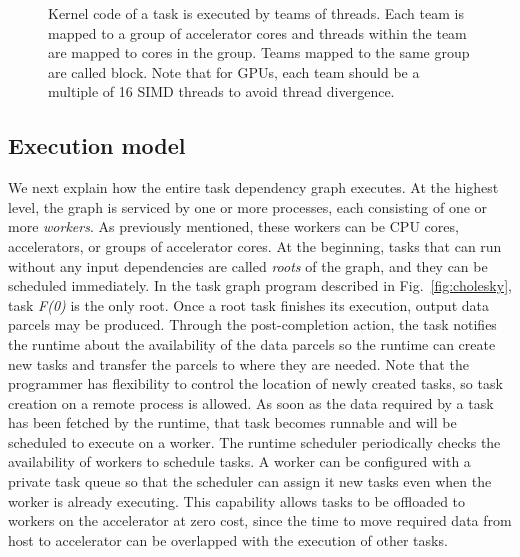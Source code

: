 \begin{figure}[htp]

\caption{Kernel code of a task is executed by teams of threads. Each team is mapped to a group of accelerator cores and threads within the team are mapped to cores in the group. Teams mapped to the same group are called block. Note that for GPUs, each team should be a multiple of 16 SIMD threads to avoid thread divergence.}
\label{fig:program}
\end{figure}


\subsection{Execution model}
We next explain how the entire task dependency graph executes.
At the highest level, the graph is serviced by one or more processes, each consisting of one or more {\em workers}.
As previously mentioned, these workers can be CPU cores, accelerators, or groups of accelerator cores.
At the beginning, tasks that can run without any input dependencies are called {\em roots} of the graph, and they can be scheduled immediately.
In the task graph program described in Fig.~\ref{fig:cholesky}, task {\em F(0)} is the only root.
Once a root task finishes its execution, output data parcels may be produced.
Through the post-completion action, the task notifies the runtime about the availability of the data parcels so the runtime can create new tasks and transfer the parcels to where they are needed.
Note that the programmer has flexibility to control the location of newly created tasks, so task creation on a remote process is allowed.
As soon as the data required by a task has been fetched by the runtime, that task becomes runnable
and will be scheduled to execute on a worker.
The runtime scheduler periodically checks the availability of workers to schedule tasks.
A worker can be configured with a private task queue so that the scheduler can assign it new tasks even when the worker is already executing.
This capability allows tasks to be offloaded to workers on the accelerator at zero cost, since the time to move required data from host to accelerator can be overlapped with the execution of other tasks.



